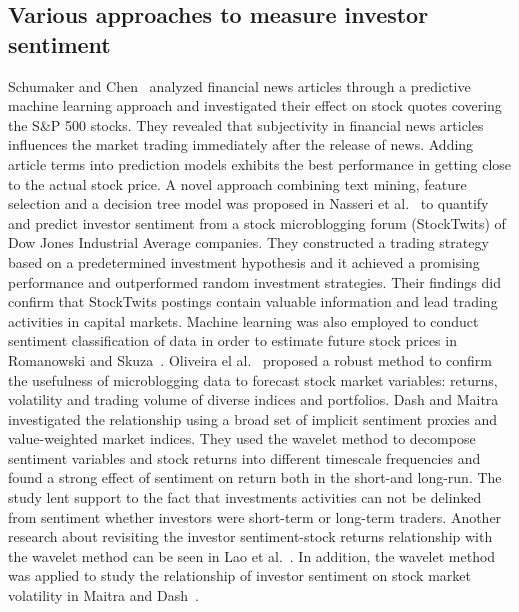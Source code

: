 \documentclass[review,3p,times,12pt,number]{elsarticle}
\begin{document}
\subsection{Various approaches to measure investor sentiment}
Schumaker and Chen~\cite{schumaker2009textual} analyzed financial news articles through a predictive machine learning approach and investigated their effect on stock quotes covering the S\&P 500 stocks. They revealed that subjectivity in financial news articles influences the market trading immediately after the release of news. Adding article terms into prediction models exhibits the best performance in getting close to the actual stock price.
A novel approach combining text mining, feature selection and a decision tree model was proposed in Nasseri et al.~\cite{Nasseri2015Quantifying} to quantify and predict investor sentiment from a stock microblogging forum (StockTwits) of Dow Jones Industrial Average companies. They constructed a trading strategy based on a predetermined investment hypothesis and it achieved a promising performance and outperformed random investment strategies. Their findings did confirm that StockTwits postings contain valuable information and lead trading activities in capital markets.
Machine learning was also employed to conduct sentiment classification of data in order to estimate future stock prices in Romanowski and Skuza~\cite{Romanowski2017}.
Oliveira el al.~\cite{Oliveira2017The} proposed a robust method to confirm the usefulness of microblogging data to forecast stock market variables: returns, volatility and trading volume of diverse indices and portfolios.
Dash and Maitra~\cite{Dash2017Does} investigated the relationship using a broad set of implicit sentiment proxies and value-weighted market indices. They used the wavelet method to decompose sentiment variables and stock returns into different timescale frequencies and found a strong effect of sentiment on return both in the short-and long-run. The study lent support to the fact that investments activities can not be delinked from sentiment whether investors were short-term or long-term traders. Another research about revisiting the investor sentiment-stock returns relationship with the wavelet method can be seen in Lao et al.~\cite{Lao2018Revisiting}.
In addition, the wavelet method was applied to study the relationship of investor sentiment on stock market volatility in Maitra and Dash~\cite{Maitra2017Sentiment}.
\end{document}
